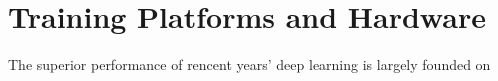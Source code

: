 \section{Training Platforms and Hardware}
The superior performance of rencent years' deep learning is largely founded on 